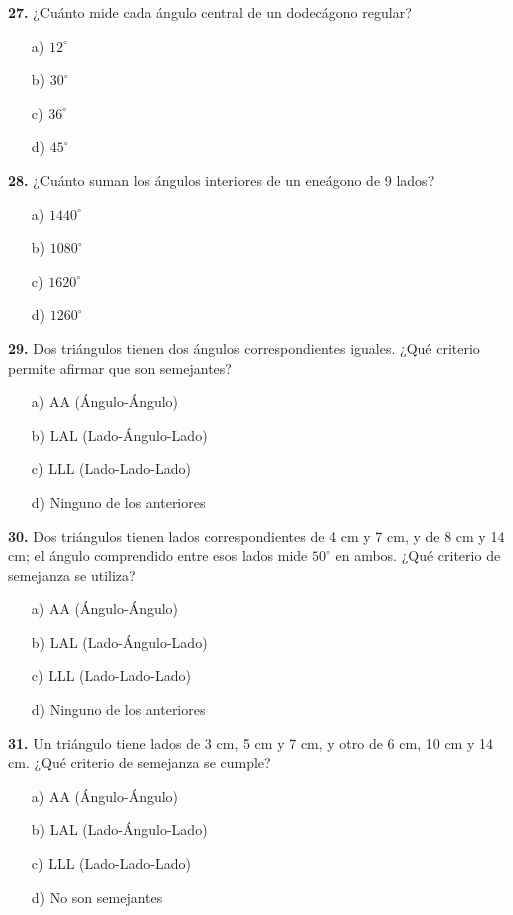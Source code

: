 \noindent\textbf{27.} ¿Cuánto mide cada ángulo central de un dodecágono regular?

\begin{itemize}
    \item[a)] $12^\circ$
    \item[b)] $30^\circ$
    \item[c)] $36^\circ$
    \item[d)] $45^\circ$
\end{itemize}


\noindent\textbf{28.} ¿Cuánto suman los ángulos interiores de un eneágono de 9 lados?

\begin{itemize}
    \item[a)] $1440^\circ$
    \item[b)] $1080^\circ$
    \item[c)] $1620^\circ$
    \item[d)] $1260^\circ$
\end{itemize}


\noindent\textbf{29.} Dos triángulos tienen dos ángulos correspondientes iguales. ¿Qué criterio permite afirmar que son semejantes?

\begin{itemize}
    \item[a)] AA (Ángulo-Ángulo)
    \item[b)] LAL (Lado-Ángulo-Lado)
    \item[c)] LLL (Lado-Lado-Lado)
    \item[d)] Ninguno de los anteriores
\end{itemize}


\noindent\textbf{30.} Dos triángulos tienen lados correspondientes de 4 cm y 7 cm, y de 8 cm y 14 cm; el ángulo comprendido entre esos lados mide $50^\circ$ en ambos. ¿Qué criterio de semejanza se utiliza?

\begin{itemize}
    \item[a)] AA (Ángulo-Ángulo)
    \item[b)] LAL (Lado-Ángulo-Lado)
    \item[c)] LLL (Lado-Lado-Lado)
    \item[d)] Ninguno de los anteriores
\end{itemize}


\noindent\textbf{31.} Un triángulo tiene lados de 3 cm, 5 cm y 7 cm, y otro de 6 cm, 10 cm y 14 cm. ¿Qué criterio de semejanza se cumple?

\begin{itemize}
    \item[a)] AA (Ángulo-Ángulo)
    \item[b)] LAL (Lado-Ángulo-Lado)
    \item[c)] LLL (Lado-Lado-Lado)
    \item[d)] No son semejantes
\end{itemize}


